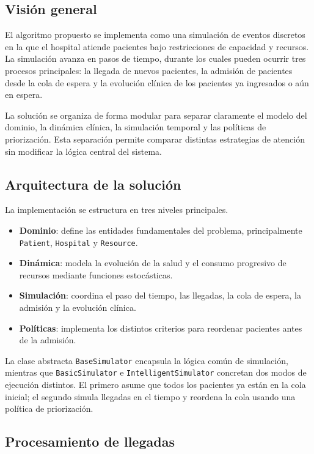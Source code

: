 \documentclass[12pt,a4paper]{article}
\begin{document}
\subsection{Visión general}

El algoritmo propuesto se implementa como una simulación de eventos discretos en la que 
el hospital atiende pacientes bajo restricciones de capacidad y recursos. 
La simulación avanza en pasos de tiempo, durante los cuales pueden ocurrir tres procesos principales: 
la llegada de nuevos pacientes, la admisión de pacientes desde la cola de espera y 
la evolución clínica de los pacientes ya ingresados o aún en espera.

La solución se organiza de forma modular para separar claramente el modelo del dominio, 
la dinámica clínica, la simulación temporal y las políticas de priorización. 
Esta separación permite comparar distintas estrategias de atención sin modificar la lógica central del sistema.

\subsection{Arquitectura de la solución}

La implementación se estructura en tres niveles principales.

\begin{itemize}
    \item \textbf{Dominio}: define las entidades fundamentales del problema, principalmente \texttt{Patient}, \texttt{Hospital} y \texttt{Resource}.
    \item \textbf{Dinámica}: modela la evolución de la salud y el consumo progresivo de recursos mediante funciones estocásticas.
    \item \textbf{Simulación}: coordina el paso del tiempo, las llegadas, la cola de espera, la admisión y la evolución clínica.
    \item \textbf{Políticas}: implementa los distintos criterios para reordenar pacientes antes de la admisión.
\end{itemize}

La clase abstracta \texttt{BaseSimulator} encapsula la lógica común de simulación, 
mientras que \texttt{BasicSimulator} e \texttt{IntelligentSimulator} concretan dos modos de ejecución distintos. 
El primero asume que todos los pacientes ya están en la cola inicial; el segundo simula llegadas en el tiempo y 
reordena la cola usando una política de priorización.

\subsection{Procesamiento de llegadas}
\end{document}
